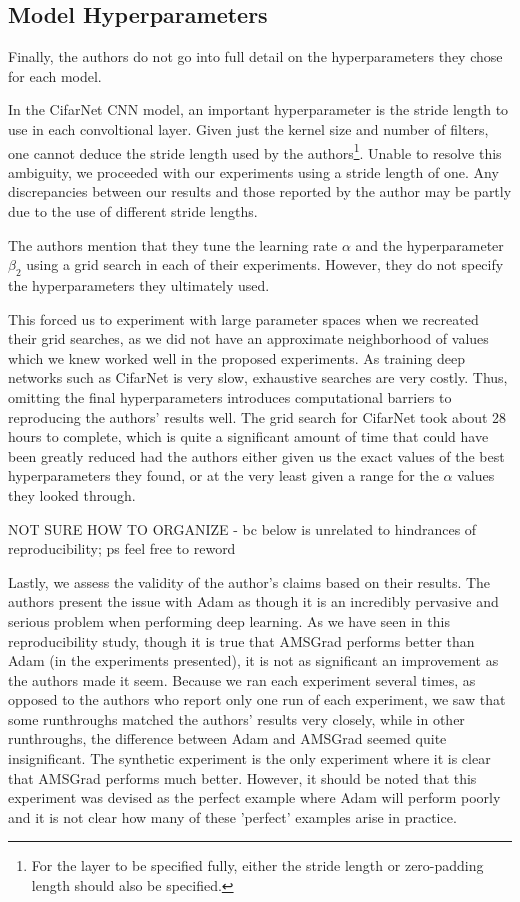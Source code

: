 \documentclass[letterpaper, 10 pt, conference]{ieeeconf}  %
\begin{document}
\subsection{Model Hyperparameters}

Finally, the authors do not go into full detail on the hyperparameters they chose for each model. 

In the CifarNet CNN model, an important hyperparameter is the stride length to use in each convoltional layer. Given just the kernel size and number of filters, one cannot deduce the stride length used by the authors\footnote{For the layer to be specified fully, either the stride length or zero-padding length should also be specified.}. Unable to resolve this ambiguity, we proceeded with our experiments using a stride length of one. Any discrepancies between our results and those reported by the author may be partly due to the use of different stride lengths. 

The authors mention that they tune the learning rate $\alpha$ and the hyperparameter $\beta_2$ using a grid search in each of their experiments. However, they do not specify the hyperparameters they ultimately used. 

This forced us to experiment with large parameter spaces when we recreated their grid searches, as we did not have an approximate neighborhood of values which we knew worked well in the proposed experiments. As training deep networks such as CifarNet is very slow, exhaustive searches are very costly. Thus, omitting the final hyperparameters introduces computational barriers to reproducing the authors' results well. The grid search for CifarNet took about 28 hours to complete, which is quite a significant amount of time that could have been greatly reduced had the authors either given us the exact values of the best hyperparameters they found, or at the very least given a range for the $\alpha$ values they looked through. 

NOT SURE HOW TO ORGANIZE - bc below is unrelated to hindrances of reproducibility; ps feel free to reword

Lastly, we assess the validity of the author's claims based on their results. The authors present the issue with Adam as though it is an incredibly pervasive and serious problem when performing deep learning. As we have seen in this reproducibility study, though it is true that AMSGrad performs better than Adam (in the experiments presented), it is not as significant an improvement as the authors made it seem. Because we ran each experiment several times, as opposed to the authors who report only one run of each experiment, we saw that some runthroughs matched the authors' results very closely, while in other runthroughs, the difference between Adam and AMSGrad seemed quite insignificant. The synthetic experiment is the only experiment where it is clear that AMSGrad performs much better. However, it should be noted that this experiment was devised as the perfect example where Adam will perform poorly and it is not clear how many of these 'perfect' examples arise in practice. 
\end{document}
